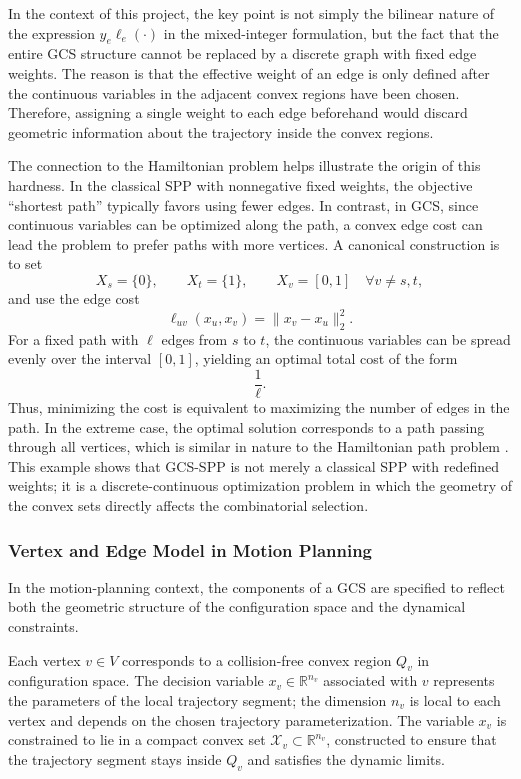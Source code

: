 In the context of this project, the key point is not simply the bilinear nature of
the expression $y_e \ell_e(\cdot)$ in the mixed-integer formulation, but the fact
that the entire GCS structure cannot be replaced by a discrete graph with fixed
edge weights. The reason is that the effective weight of an edge is only defined
after the continuous variables in the adjacent convex regions have been chosen.
Therefore, assigning a single weight to each edge beforehand would discard
geometric information about the trajectory inside the convex regions.

The connection to the Hamiltonian problem helps illustrate the origin of this
hardness. In the classical SPP with nonnegative fixed weights, the objective
``shortest path'' typically favors using fewer edges. In contrast, in GCS, since
continuous variables can be optimized along the path, a convex edge cost can lead
the problem to prefer paths with more vertices. A canonical construction is to set
\[
  X_s=\{0\}, \qquad
  X_t=\{1\}, \qquad
  X_v=[0,1] \quad \forall v\neq s,t,
\]
and use the edge cost
\[
  \ell_{uv}(x_u,x_v)=\|x_v-x_u\|_2^2 .
\]
For a fixed path with $\ell$ edges from $s$ to $t$, the continuous variables can be
spread evenly over the interval $[0,1]$, yielding an optimal total cost of the form
\[
  \frac{1}{\ell}.
\]
Thus, minimizing the cost is equivalent to maximizing the number of edges in the
path. In the extreme case, the optimal solution corresponds to a path passing through
all vertices, which is similar in nature to the Hamiltonian path problem
\cite{Marcucci2024Thesis}. This example shows that GCS-SPP is not merely a
classical SPP with redefined weights; it is a discrete-continuous optimization
problem in which the geometry of the convex sets directly affects the combinatorial
selection.

\subsubsection{Vertex and Edge Model in Motion Planning}
\label{subsubsec:gcs_vertex_edge}

In the motion-planning context, the components of a GCS are specified to reflect
both the geometric structure of the configuration space and the dynamical
constraints.

Each vertex $v \in V$ corresponds to a collision-free convex region $Q_v$ in
configuration space. The decision variable $x_v \in \mathbb{R}^{n_v}$ associated
with $v$ represents the parameters of the local trajectory segment; the dimension
$n_v$ is local to each vertex and depends on the chosen trajectory parameterization.
The variable $x_v$ is constrained to lie in a compact convex set
$\mathcal{X}_v \subset \mathbb{R}^{n_v}$, constructed to ensure that the trajectory
segment stays inside $Q_v$ and satisfies the dynamic limits.

